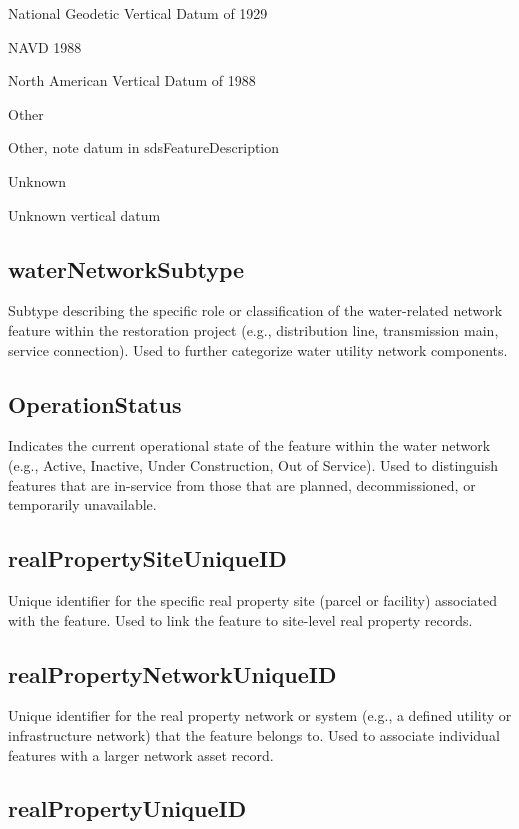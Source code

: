\documentclass[
  letterpaper,
  DIV=11,
  numbers=noendperiod]{scrreprt}
\begin{document}
National Geodetic Vertical Datum of 1929

NAVD 1988

North American Vertical Datum of 1988

Other

Other, note datum in sdsFeatureDescription

Unknown

Unknown vertical datum

\subsection{waterNetworkSubtype}\label{waternetworksubtype-1}

Subtype describing the specific role or classification of the
water-related network feature within the restoration project (e.g.,
distribution line, transmission main, service connection). Used to
further categorize water utility network components.

\subsection{OperationStatus}\label{operationstatus-4}

Indicates the current operational state of the feature within the water
network (e.g., Active, Inactive, Under Construction, Out of Service).
Used to distinguish features that are in-service from those that are
planned, decommissioned, or temporarily unavailable.

\subsection{realPropertySiteUniqueID}\label{realpropertysiteuniqueid-5}

Unique identifier for the specific real property site (parcel or
facility) associated with the feature. Used to link the feature to
site-level real property records.

\subsection{realPropertyNetworkUniqueID}\label{realpropertynetworkuniqueid-5}

Unique identifier for the real property network or system (e.g., a
defined utility or infrastructure network) that the feature belongs to.
Used to associate individual features with a larger network asset
record.

\subsection{realPropertyUniqueID}\label{realpropertyuniqueid-1}
\end{document}
